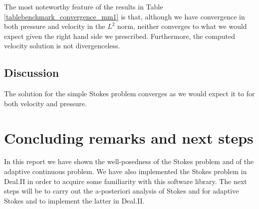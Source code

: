 \documentclass[12pt,a4paper]{article}
\theoremstyle{definition}
\begin{document}
The most noteworthy feature of the results in Table \ref{tablebenchmark_convergence_mm1} is that, although we have convergence in both pressure and velocity in the $L^2$ norm, neither converges to what we would expect given the right hand side we prescribed.  Furthermore, the computed velocity solution is not divergenceless.
\subsection{Discussion}\label{sec_dealii_discussion}
The solution for the simple Stokes problem converges as we would expect it to for both velocity and pressure.  
\section{Concluding remarks and next steps}\label{sec_conclusion}
In this report we have shown the well-posedness of the Stokes problem and of the adaptive continuous problem.  We have also implemented the Stokes problem in Deal.II in order to acquire some familiarity with this software library.  The next steps will be to carry out the a-posteriori analysis of Stokes and for adaptive Stokes and to implement the latter  in Deal.II.  



\end{document}
